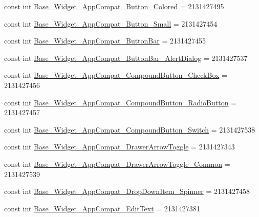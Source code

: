 \begin{DoxyCompactItemize}
\item 
const int \mbox{\hyperlink{class_f_w_p_s___app_1_1_droid_1_1_resource_1_1_style_a42c30a494162ec338bfb6235674ee518}{Base\+\_\+\+Widget\+\_\+\+App\+Compat\+\_\+\+Button\+\_\+\+Colored}} = 2131427495
\item 
const int \mbox{\hyperlink{class_f_w_p_s___app_1_1_droid_1_1_resource_1_1_style_ad30c145eab291ac432fcf569d144a28d}{Base\+\_\+\+Widget\+\_\+\+App\+Compat\+\_\+\+Button\+\_\+\+Small}} = 2131427454
\item 
const int \mbox{\hyperlink{class_f_w_p_s___app_1_1_droid_1_1_resource_1_1_style_a3f3b62ac1d75ddc486e1089e08d0383e}{Base\+\_\+\+Widget\+\_\+\+App\+Compat\+\_\+\+Button\+Bar}} = 2131427455
\item 
const int \mbox{\hyperlink{class_f_w_p_s___app_1_1_droid_1_1_resource_1_1_style_ac9a629c8700a05ead27b2d23718089c7}{Base\+\_\+\+Widget\+\_\+\+App\+Compat\+\_\+\+Button\+Bar\+\_\+\+Alert\+Dialog}} = 2131427537
\item 
const int \mbox{\hyperlink{class_f_w_p_s___app_1_1_droid_1_1_resource_1_1_style_a380d8c9756bd915103d7ec1954b8a521}{Base\+\_\+\+Widget\+\_\+\+App\+Compat\+\_\+\+Compound\+Button\+\_\+\+Check\+Box}} = 2131427456
\item 
const int \mbox{\hyperlink{class_f_w_p_s___app_1_1_droid_1_1_resource_1_1_style_aa4d1c1d1bf541c8e1ee5f851656f847e}{Base\+\_\+\+Widget\+\_\+\+App\+Compat\+\_\+\+Compound\+Button\+\_\+\+Radio\+Button}} = 2131427457
\item 
const int \mbox{\hyperlink{class_f_w_p_s___app_1_1_droid_1_1_resource_1_1_style_abc716bdaa67932fb6452e508e2f39fff}{Base\+\_\+\+Widget\+\_\+\+App\+Compat\+\_\+\+Compound\+Button\+\_\+\+Switch}} = 2131427538
\item 
const int \mbox{\hyperlink{class_f_w_p_s___app_1_1_droid_1_1_resource_1_1_style_a8116ad159e202a4dfe36f25852059573}{Base\+\_\+\+Widget\+\_\+\+App\+Compat\+\_\+\+Drawer\+Arrow\+Toggle}} = 2131427343
\item 
const int \mbox{\hyperlink{class_f_w_p_s___app_1_1_droid_1_1_resource_1_1_style_ad52e04ed6f713733e1f4ff319f99944a}{Base\+\_\+\+Widget\+\_\+\+App\+Compat\+\_\+\+Drawer\+Arrow\+Toggle\+\_\+\+Common}} = 2131427539
\item 
const int \mbox{\hyperlink{class_f_w_p_s___app_1_1_droid_1_1_resource_1_1_style_a9bf6a4b62a20935f754edc5f56e2ab3c}{Base\+\_\+\+Widget\+\_\+\+App\+Compat\+\_\+\+Drop\+Down\+Item\+\_\+\+Spinner}} = 2131427458
\item 
const int \mbox{\hyperlink{class_f_w_p_s___app_1_1_droid_1_1_resource_1_1_style_aeba04f48d87c27e4e6a0fe1019c6c9a1}{Base\+\_\+\+Widget\+\_\+\+App\+Compat\+\_\+\+Edit\+Text}} = 2131427381

\end{DoxyCompactItemize}
